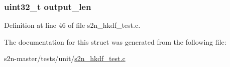 \subsubsection[{\texorpdfstring{output\+\_\+len}{output_len}}]{\setlength{\rightskip}{0pt plus 5cm}uint32\+\_\+t output\+\_\+len}\hypertarget{structhkdf__test__vector_a050d5038dbe2b4ba61d06c8a5b89382a}{}\label{structhkdf__test__vector_a050d5038dbe2b4ba61d06c8a5b89382a}


Definition at line 46 of file s2n\+\_\+hkdf\+\_\+test.\+c.



The documentation for this struct was generated from the following file\+:\begin{DoxyCompactItemize}
\item 
s2n-\/master/tests/unit/\hyperlink{s2n__hkdf__test_8c}{s2n\+\_\+hkdf\+\_\+test.\+c}\end{DoxyCompactItemize}
